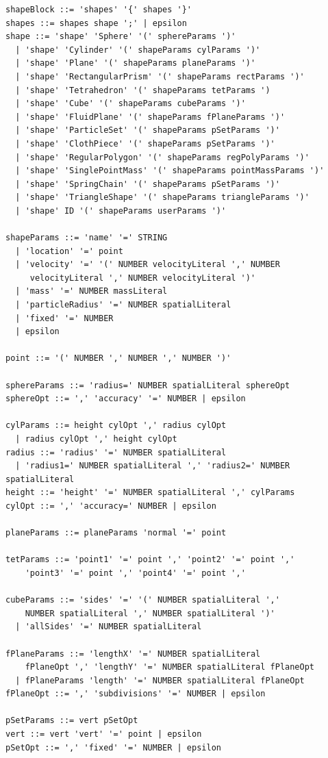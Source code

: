 \begin{verbatim}
shapeBlock ::= 'shapes' '{' shapes '}'
shapes ::= shapes shape ';' | epsilon
shape ::= 'shape' 'Sphere' '(' sphereParams ')' 
  | 'shape' 'Cylinder' '(' shapeParams cylParams ')' 
  | 'shape' 'Plane' '(' shapeParams planeParams ')' 
  | 'shape' 'RectangularPrism' '(' shapeParams rectParams ')' 
  | 'shape' 'Tetrahedron' '(' shapeParams tetParams ') 
  | 'shape' 'Cube' '(' shapeParams cubeParams ')'
  | 'shape' 'FluidPlane' '(' shapeParams fPlaneParams ')'
  | 'shape' 'ParticleSet' '(' shapeParams pSetParams ')'
  | 'shape' 'ClothPiece' '(' shapeParams pSetParams ')'
  | 'shape' 'RegularPolygon' '(' shapeParams regPolyParams ')'
  | 'shape' 'SinglePointMass' '(' shapeParams pointMassParams ')'
  | 'shape' 'SpringChain' '(' shapeParams pSetParams ')'
  | 'shape' 'TriangleShape' '(' shapeParams triangleParams ')'
  | 'shape' ID '(' shapeParams userParams ')' 

shapeParams ::= 'name' '=' STRING
  | 'location' '=' point
  | 'velocity' '=' '(' NUMBER velocityLiteral ',' NUMBER 
     velocityLiteral ',' NUMBER velocityLiteral ')'
  | 'mass' '=' NUMBER massLiteral
  | 'particleRadius' '=' NUMBER spatialLiteral
  | 'fixed' '=' NUMBER
  | epsilon

point ::= '(' NUMBER ',' NUMBER ',' NUMBER ')'

sphereParams ::= 'radius=' NUMBER spatialLiteral sphereOpt
sphereOpt ::= ',' 'accuracy' '=' NUMBER | epsilon

cylParams ::= height cylOpt ',' radius cylOpt 
  | radius cylOpt ',' height cylOpt
radius ::= 'radius' '=' NUMBER spatialLiteral
  | 'radius1=' NUMBER spatialLiteral ',' 'radius2=' NUMBER spatialLiteral 
height ::= 'height' '=' NUMBER spatialLiteral ',' cylParams
cylOpt ::= ',' 'accuracy=' NUMBER | epsilon

planeParams ::= planeParams 'normal '=' point

tetParams ::= 'point1' '=' point ',' 'point2' '=' point ',' 
    'point3' '=' point ',' 'point4' '=' point ','

cubeParams ::= 'sides' '=' '(' NUMBER spatialLiteral ',' 
    NUMBER spatialLiteral ',' NUMBER spatialLiteral ')'
  | 'allSides' '=' NUMBER spatialLiteral

fPlaneParams ::= 'lengthX' '=' NUMBER spatialLiteral 
    fPlaneOpt ',' 'lengthY' '=' NUMBER spatialLiteral fPlaneOpt
  | fPlaneParams 'length' '=' NUMBER spatialLiteral fPlaneOpt
fPlaneOpt ::= ',' 'subdivisions' '=' NUMBER | epsilon

pSetParams ::= vert pSetOpt
vert ::= vert 'vert' '=' point | epsilon
pSetOpt ::= ',' 'fixed' '=' NUMBER | epsilon


\end{verbatim}
